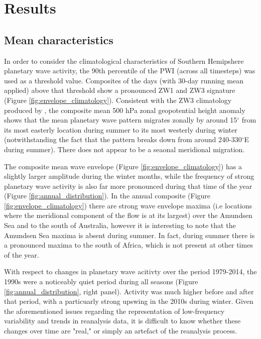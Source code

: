 \section{Results}

\subsection{Mean characteristics}

In order to consider the climatological characteristics of Southern Hemipshere planetary wave activity, the 90th percentile of the PWI (across all timesteps) was used as a threshold value. Composites of the days (with 30-day running mean applied) above that threshold show a pronounced ZW1 and ZW3 signature (Figure \ref{fig:envelope_climatology}). Consistent with the ZW3 climatology produced by \citet{Raphael2004}, the composite mean 500 hPa zonal geopotential height anomaly shows that the mean planetary wave pattern migrates zonally by around 15$^{\circ}$ from its most easterly location during summer to its most westerly during winter (notwithstanding the fact that the pattern breaks down from around 240-330$^{\circ}$E during summer). There does not appear to be a seaonal meridional migration.

The composite mean wave envelope (Figure \ref{fig:envelope_climatology}) has a slightly larger amplitude during the winter months, while the frequency of strong planetary wave activity is also far more pronounced during that time of the year (Figure \ref{fig:annual_distribution}). In the annual composite (Figure \ref{fig:envelope_climatology}) there are strong wave envelope maxima (i.e locations where the meridional component of the flow is at its largest) over the Amundsen Sea and to the south of Australia, however it is interesting to note that the Amundsen Sea maxima is absent during summer. In fact, during summer there is a pronounced maxima to the south of Africa, which is not present at other times of the year.

With respect to changes in planetary wave acitivty over the period 1979-2014, the 1990s were a noticeably quiet period during all seasons (Figure \ref{fig:annual_distribution}, right panel). Activity was much higher before and after that period, with a particuarly strong upswing in the 2010s during winter. Given the aforementioned issues regarding the representation of low-frequency variability and trends in reanalysis data, it is difficult to know whether these changes over time are "real," or simply an artefact of the reanalysis process.
